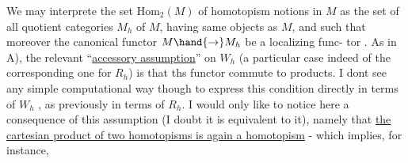 We may interprete the set $\mathrm{Hom}_2(M)$ of homotopism notions in $M$ as the
set of all quotient categories $M_h$ of $M$, having same  objects as $M$,
and such that moreover the canonical functor $M \hand{\to} M_h$ be a localizing func-%
tor . As in A), the relevant ``\uline{accessory assumption}'' on $W_h$ (a particular
case indeed of the corresponding one for $R_h$) is that ths functor commute
to products. I dont see any  simple computational way though to 
express this condition directly in terms of $W_h$ , as previously in terms of
$R_h$. I would only like to notice here a consequence of this assumption
(I doubt it is equivalent to it), namely that \uline{the cartesian product of
two homotopisms is again a homotopism} - which implies, for instance,

